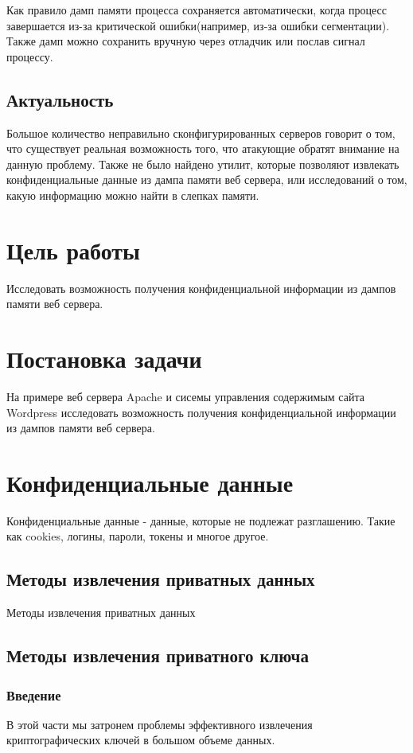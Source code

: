 \documentclass[20pt]{article}
\begin{document}
Как правило дамп памяти процесса сохраняется автоматически, когда процесс завершается из-за критической ошибки(например, из-за ошибки сегментации).
Также дамп можно сохранить вручную через отладчик или послав сигнал процессу.

\subsection{Актуальность}
Большое количество неправильно сконфигурированных серверов говорит о том, что существует реальная возможность того, что атакующие
обратят внимание на данную проблему. Также не было найдено утилит, которые позволяют извлекать конфиденциальные данные из дампа памяти веб сервера,
или исследований о том, какую информацию можно найти в слепках памяти.

\newpage

\section{Цель работы}
Исследовать возможность получения конфиденциальной информации из дампов памяти веб сервера.

\newpage

\section{Постановка задачи}
На примере веб сервера Apache и сисемы управления содержимым сайта Wordpress исследовать возможность получения конфиденциальной информации
из дампов памяти веб сервера.

\newpage

\section{Конфиденциальные данные}
Конфиденциальные данные - данные, которые не подлежат разглашению. Такие как cookies, логины, пароли, токены и многое другое.

\subsection{Методы извлечения приватных данных}
Методы извлечения приватных данных

\subsection{Методы извлечения приватного ключа}
\subsubsection{Введение}
В этой части мы затронем проблемы эффективного извлечения криптографических ключей в большом объеме данных.
\end{document}
